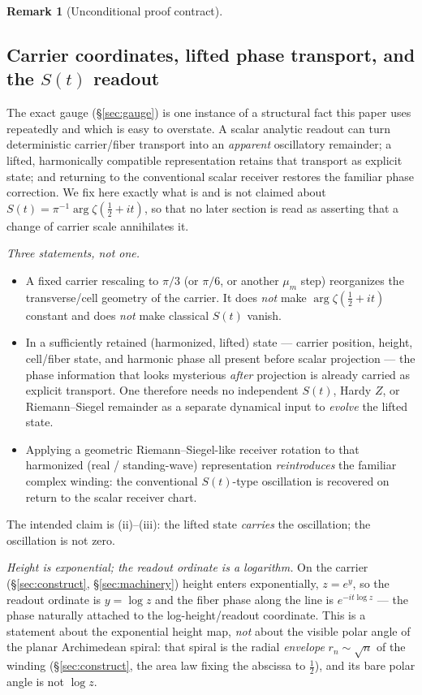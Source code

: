 \documentclass[11pt]{article}
\newcommand{\inst}[1]{%
\samnote{INSTRUCTION: #1}%
}
\theoremstyle{definition}
\newtheorem{remark}[theorem]{Remark}
\begin{document}
\begin{remark}[Unconditional proof contract]
\begin{enumerate}
\section{Carrier coordinates, lifted phase transport, and the \texorpdfstring{$S(t)$}{S(t)} readout}\label{sec:st}
\inst{MOVE THIS TO ITS OWN SECTION}
The exact gauge (\S\ref{sec:gauge}) is one instance of a structural fact this paper uses repeatedly and which
is easy to overstate. A scalar analytic readout can turn deterministic carrier/fiber transport into an
\emph{apparent} oscillatory remainder; a lifted, harmonically compatible representation retains that transport
as explicit state; and returning to the conventional scalar receiver restores the familiar phase correction.
We fix here exactly what is and is not claimed about $S(t)=\pi^{-1}\arg\zeta(\tfrac12+it)$, so that no later
section is read as asserting that a change of carrier scale annihilates it.

\emph{Three statements, not one.}
\begin{itemize}
\item[(i)] A fixed carrier rescaling to $\pi/3$ (or $\pi/6$, or another $\mu_m$ step) reorganizes the
transverse/cell geometry of the carrier. It does \emph{not} make $\arg\zeta(\tfrac12+it)$ constant and does
\emph{not} make classical $S(t)$ vanish.
\item[(ii)] In a sufficiently retained (harmonized, lifted) state --- carrier position, height, cell/fiber
state, and harmonic phase all present before scalar projection --- the phase information that looks mysterious
\emph{after} projection is already carried as explicit transport. One therefore needs no independent $S(t)$,
Hardy $Z$, or Riemann--Siegel remainder as a separate dynamical input to \emph{evolve} the lifted state.
\item[(iii)] Applying a geometric Riemann--Siegel-like receiver rotation to that harmonized (real /
standing-wave) representation \emph{reintroduces} the familiar complex winding: the conventional $S(t)$-type
oscillation is recovered on return to the scalar receiver chart.
\end{itemize}
The intended claim is (ii)--(iii): the lifted state \emph{carries} the oscillation; the oscillation is not
zero.

\emph{Height is exponential; the readout ordinate is a logarithm.} On the carrier (\S\ref{sec:construct},
\S\ref{sec:machinery}) height enters exponentially, $z=e^{y}$, so the readout ordinate is $y=\log z$ and the
fiber phase along the line is $e^{-it\log z}$ --- the phase naturally attached to the log-height/readout
coordinate. This is a statement about the exponential height map, \emph{not} about the visible polar angle of
the planar Archimedean spiral: that spiral is the radial \emph{envelope} $r_n\sim\sqrt n$ of the winding
(\S\ref{sec:construct}, the area law fixing the abscissa to $\tfrac12$), and its bare polar angle is not
$\log z$.


\end{enumerate}
\end{remark}
\end{document}
